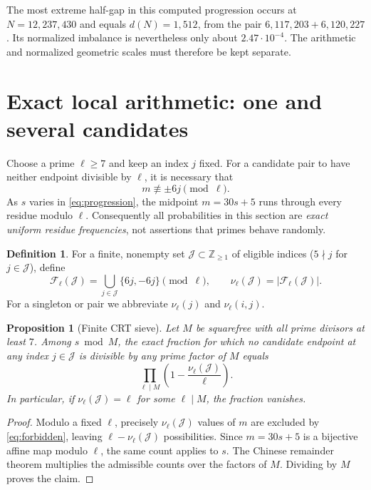 \documentclass[11pt,a4paper]{article}
\newtheorem{proposition}[theorem]{Proposition}
\theoremstyle{definition}
\newtheorem{definition}[theorem]{Definition}
\newcommand{\F}{\mathcal F}
\newcommand{\ZZ}{\mathbb Z}
\begin{document}
The most extreme half-gap in this computed progression occurs at $N=12{,}237{,}430$ and equals $d(N)=1{,}512$, from the pair $6{,}117{,}203+6{,}120{,}227$. Its normalized imbalance is nevertheless only about $2.47\cdot10^{-4}$. The arithmetic and normalized geometric scales must therefore be kept separate.

\section{Exact local arithmetic: one and several candidates}
Choose a prime $\ell\ge7$ and keep an index $j$ fixed.  For a candidate pair to have neither endpoint divisible by $\ell$, it is necessary that
\begin{equation}\label{eq:forbidden}
 m\not\equiv \pm6j\pmod\ell.
\end{equation}
As $s$ varies in \eqref{eq:progression}, the midpoint $m=30s+5$ runs through every residue modulo $\ell$.  Consequently all probabilities in this section are \emph{exact uniform residue frequencies}, not assertions that primes behave randomly.

\begin{definition}
For a finite, nonempty set $\mathcal J\subset\ZZ_{\ge1}$ of eligible indices ($5\nmid j$ for $j\in\mathcal J$), define
\[
 \F_\ell(\mathcal J)=\bigcup_{j\in\mathcal J}\{6j,-6j\}\pmod\ell,
 \qquad \nu_\ell(\mathcal J)=|\F_\ell(\mathcal J)|.
\]
For a singleton or pair we abbreviate $\nu_\ell(j)$ and $\nu_\ell(i,j)$.
\end{definition}

\begin{proposition}[Finite CRT sieve]\label{prop:CRT}
Let $M$ be squarefree with all prime divisors at least $7$.  Among $s\bmod M$, the exact fraction for which no candidate endpoint at any index $j\in\mathcal J$ is divisible by any prime factor of $M$ equals
\begin{equation}\label{eq:CRT}
 \prod_{\ell\mid M}\left(1-\frac{\nu_\ell(\mathcal J)}\ell\right).
\end{equation}
In particular, if $\nu_\ell(\mathcal J)=\ell$ for some $\ell\mid M$, the fraction vanishes.
\end{proposition}
\begin{proof}
Modulo a fixed $\ell$, precisely $\nu_\ell(\mathcal J)$ values of $m$ are excluded by \eqref{eq:forbidden}, leaving $\ell-\nu_\ell(\mathcal J)$ possibilities. Since $m=30s+5$ is a bijective affine map modulo $\ell$, the same count applies to $s$. The Chinese remainder theorem multiplies the admissible counts over the factors of $M$. Dividing by $M$ proves the claim.
\end{proof}
\end{document}
